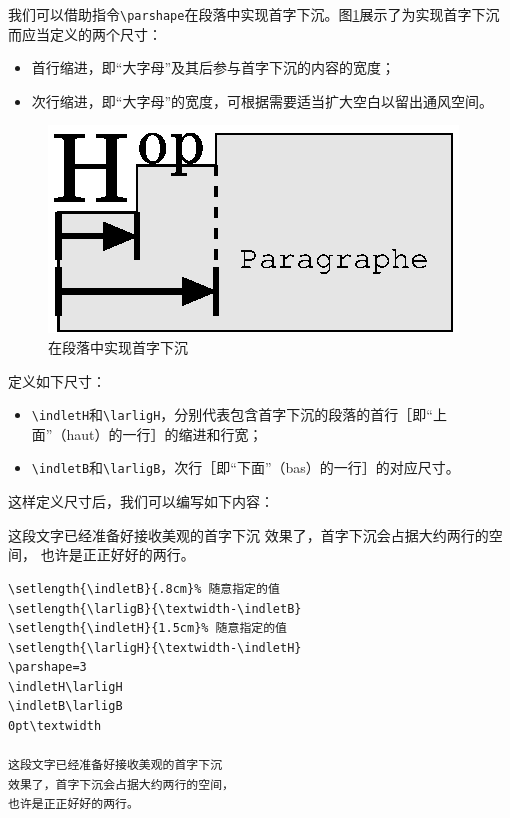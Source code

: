 我们可以借助指令\verb|\parshape|在段落中实现首字下沉。图\ref{fig:11.3}展示了为实现首字下沉而应当定义的两个尺寸：

\begin{itemize}
    \item 首行缩进，即“大字母”及其后参与首字下沉的内容的宽度；
    \item 次行缩进，即“大字母”的宽度，可根据需要适当扩大空白以留出通风空间。
\end{itemize}

\begin{figure}[ht]
    \begin{center}
      \includegraphics{img/lettrine}
    \end{center}
    \caption{在段落中实现首字下沉}
    \label{fig:11.3}
\end{figure}

定义如下尺寸：

\begin{itemize}
\item \verb|\indletH|和\verb|\larligH|，分别代表包含首字下沉的段落的首行［即“上面”（haut）的一行］的缩进和行宽；
\item \verb|\indletB|和\verb|\larligB|，次行［即“下面”（bas）的一行］的对应尺寸。
\end{itemize}

这样定义尺寸后，我们可以编写如下内容：

\begin{codelist}[11/23]{
\newlength{\indletB}
\newlength{\indletH}
\newlength{\larligB}
\newlength{\larligH}
\setlength{\indletB}{.8cm}%
\setlength{\larligB}{\textwidth-\indletB}
\setlength{\indletH}{1.5cm}%
\setlength{\larligH}{\textwidth-\indletH}
\indletH\larligH
\indletB\larligB
0pt\textwidth
这段文字已经准备好接收美观的首字下沉
效果了，首字下沉会占据大约两行的空间，
也许是正正好好的两行。
}
\begin{verbatim}
\setlength{\indletB}{.8cm}% 随意指定的值
\setlength{\larligB}{\textwidth-\indletB}
\setlength{\indletH}{1.5cm}% 随意指定的值
\setlength{\larligH}{\textwidth-\indletH}
\parshape=3
\indletH\larligH
\indletB\larligB
0pt\textwidth

这段文字已经准备好接收美观的首字下沉
效果了，首字下沉会占据大约两行的空间，
也许是正正好好的两行。\end{verbatim}
\end{codelist}

